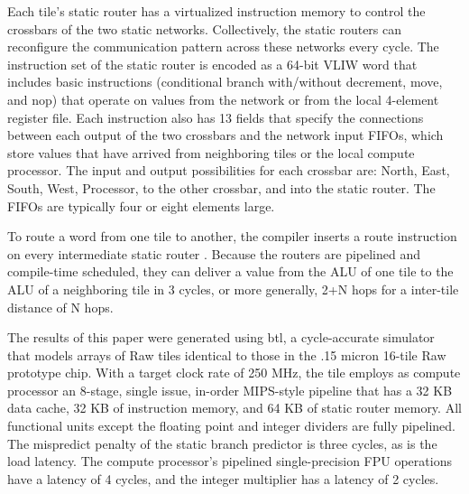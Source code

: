 Each tile's static router has a virtualized instruction memory to
control the crossbars of the two static networks. Collectively, the
static routers can reconfigure the communication pattern across these
networks every cycle.  The instruction set of the static router is
encoded as a 64-bit VLIW word that includes basic instructions
(conditional branch with/without decrement, move, and nop) that
operate on values from the network or from the local 4-element
register file. Each instruction also has 13 fields that specify the
connections between each output of the two crossbars and the network
input FIFOs, which store values that have arrived from neighboring
tiles or the local compute processor.  The input and output
possibilities for each crossbar are: North, East, South, West,
Processor, to the other crossbar, and into the static router. The
FIFOs are typically four or eight elements large.

To route a word from one tile to another, the compiler inserts a route
instruction on every intermediate static router \cite{lee98spacetime}.
Because the routers are pipelined and compile-time scheduled, they can
deliver a value from the ALU of one tile to the ALU of a neighboring
tile in 3 cycles, or more generally, 2+N hops for a inter-tile
distance of N hops.

The results of this paper were generated using btl, a cycle-accurate
simulator that models arrays of Raw tiles identical to those in the
.15 micron 16-tile Raw prototype chip.  With a target clock rate of
250 MHz, the tile employs as compute processor an 8-stage, single
issue, in-order MIPS-style pipeline that has a 32 KB data cache, 32 KB
of instruction memory, and 64 KB of static router memory. All
functional units except the floating point and integer dividers are
fully pipelined. The mispredict penalty of the static branch predictor
is three cycles, as is the load latency. The compute processor's
pipelined single-precision FPU operations have a latency of 4 cycles,
and the integer multiplier has a latency of 2 cycles.



